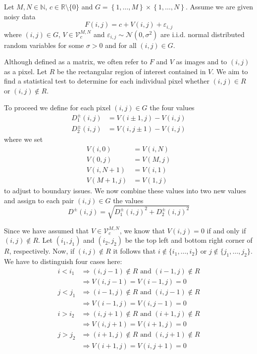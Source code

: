 \documentclass[a4paper,12pt]{article}
\theoremstyle{plain}
\theoremstyle{definition}
\theoremstyle{remark}
\begin{document}
Let $M, N \in \mathbb{N}$, $c \in \mathbb{R} \setminus \{ 0 \}$ and $G = \left\{ 1, \dots, M \right\} \times \left\{ 1, \dots, N \right\}$. Assume we are given noisy data
\begin{equation}\label{image}
	F(i, j) = c + V(i, j) + \varepsilon_{i, j}
\end{equation}
where $(i, j) \in G$, $V \in \mathcal{V}_c^{M, N}$ and $\varepsilon_{i, j} \sim \mathcal{N}(0, \sigma^2)$ are i.i.d. normal distributed random variables for some $\sigma > 0$ and for all $(i, j) \in G$.

Although defined as a matrix, we often refer to $F$ and $V$ as images and to $(i, j)$ as a pixel. Let $R$ be the rectangular region of interest contained in $V$. We aim to find a statistical test to determine for each individual pixel whether $(i, j) \in R$ or $(i, j) \notin R$.

To proceed we define for each pixel $(i, j) \in G$ the four values
\begin{align}
	D^\pm_1(i, j) &= V(i \pm 1, j) - V(i, j) \label{D1} \\
	D^\pm_2(i, j) &= V(i, j \pm 1) - V(i, j) \label{D2}
\end{align}
where we set
\begin{align*}
	V(i, 0) &= V(i, N) \\
	V(0, j) &= V(M, j) \\
	V(i, N+1) &= V(i, 1) \\
	V(M+1, j) &= V(1, j)
\end{align*}
to adjust to boundary issues. We now combine these values into two new values and assign to each pair $(i, j) \in G$ the values
\begin{equation}\label{D}
	D^\pm(i, j) = \sqrt{D_1^\pm(i, j)^2 + D_2^\pm(i, j)^2}
\end{equation}

Since we have assumed that $V \in \mathcal{V}_c^{M, N}$, we know that $V(i, j) = 0$ if and only if $(i, j) \notin R$. Let $(i_1, j_1)$ and $(i_2, j_2)$ be the top left and bottom right corner of $R$, respectively. Now, if $(i, j) \notin R$ it follows that $i \notin \{ i_1, \dots, i_2 \}$ or $j \notin \{ j_1, \dots, j_2 \}$. We have to distinguish four cases here:
\begin{align*}
	i < i_1 &\Rightarrow (i, j - 1) \notin R \textrm{ and } (i - 1, j) \notin R \\
	&\Rightarrow V(i, j - 1) = V(i - 1, j) = 0 \\
	j < j_1 &\Rightarrow (i - 1, j) \notin R \textrm{ and } (i, j - 1) \notin R \\
	&\Rightarrow V(i - 1, j) = V(i, j - 1) = 0 \\
	i > i_2 &\Rightarrow (i, j + 1) \notin R \textrm{ and } (i + 1, j) \notin R \\
	&\Rightarrow V(i, j + 1) = V(i + 1, j) = 0 \\
	j > j_2 &\Rightarrow (i + 1, j) \notin R \textrm{ and } (i, j + 1) \notin R \\
	&\Rightarrow V(i + 1, j) = V(i, j + 1) = 0
\end{align*}
\end{document}
